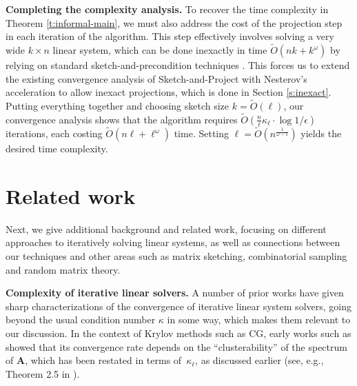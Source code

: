 \documentclass[11pt]{article}
\def\A{{\mathbf A}}
\begin{document}
\smallskip

\noindent
\textbf{Completing the complexity analysis.} 
To recover the time complexity in Theorem \ref{t:informal-main}, we must also address the cost of the projection step in each iteration of the algorithm. This step effectively involves solving a very wide $k\times n$ linear system, which can be done inexactly in time $\tilde O( nk + k^\omega)$ by relying on standard sketch-and-precondition techniques \cite{rokhlin2008fast,msm14,woodruff2014sketching}. This forces us to extend the existing convergence analysis of Sketch-and-Project with Nesterov's acceleration \cite{gower2018accelerated} to allow inexact projections, which is done in Section \ref{s:inexact}. Putting everything together and choosing sketch size $k=\tilde O(\ell)$, our convergence analysis shows that the algorithm requires $\tilde O(\frac n\ell \kappa_\ell\cdot\log1/\epsilon)$ iterations, each costing $\tilde O(n\ell + \ell^\omega)$ time. Setting $\ell = \tilde O(n^{\frac1{\omega-1}})$ yields the desired time complexity.

\section{Related work}\label{s:related-work}
Next, we give additional background and related work, focusing on different approaches to iteratively solving linear systems, as well as connections between our techniques and other areas such as matrix sketching, combinatorial sampling and random matrix theory.
\smallskip

\noindent
\textbf{Complexity of iterative linear solvers.} A number of prior works have given sharp characterizations of the convergence of iterative linear system solvers, going beyond the usual condition number $\kappa$ in some way, which makes them relevant to our discussion. In the context of Krylov methods such as CG, early works such as \cite{axelsson1986rate} showed that its convergence rate depends on the ``clusterability'' of the spectrum of $\A$, which has been restated in terms of~$\kappa_\ell$, as discussed earlier (see, e.g., Theorem 2.5 in \cite{sw09}). 
\end{document}

